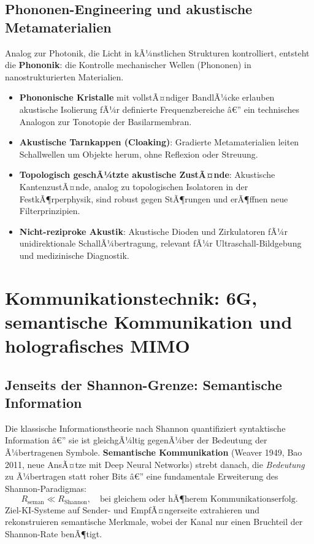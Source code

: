 ﻿\documentclass[12pt,a4paper,titlepage]{report}
\begin{document}
\subsection{Phononen-Engineering und akustische Metamaterialien}

Analog zur Photonik, die Licht in kÃ¼nstlichen Strukturen kontrolliert, entsteht
die \textbf{Phononik}: die Kontrolle mechanischer Wellen (Phononen) in
nanostrukturierten Materialien.
\begin{itemize}[leftmargin=2em]
    \item \textbf{Phononische Kristalle} mit vollstÃ¤ndiger BandlÃ¼cke erlauben
        akustische Isolierung fÃ¼r definierte Frequenzbereiche â€” ein technisches
        Analogon zur Tonotopie der Basilarmembran.
    \item \textbf{Akustische Tarnkappen (Cloaking)}: Gradierte Metamaterialien
        leiten Schallwellen um Objekte herum, ohne Reflexion oder Streuung.
    \item \textbf{Topologisch geschÃ¼tzte akustische ZustÃ¤nde}: Akustische
        KantenzustÃ¤nde, analog zu topologischen Isolatoren in der FestkÃ¶rperphysik,
        sind robust gegen StÃ¶rungen und erÃ¶ffnen neue Filterprinzipien.
    \item \textbf{Nicht-reziproke Akustik}: Akustische Dioden und Zirkulatoren
        fÃ¼r unidirektionale SchallÃ¼bertragung, relevant fÃ¼r Ultraschall-Bildgebung
        und medizinische Diagnostik.
\end{itemize}

\section{Kommunikationstechnik: 6G, semantische Kommunikation und holografisches
MIMO}

\subsection{Jenseits der Shannon-Grenze: Semantische Information}

Die klassische Informationstheorie nach Shannon quantifiziert syntaktische
Information â€” sie ist gleichgÃ¼ltig gegenÃ¼ber der Bedeutung der Ã¼bertragenen Symbole.
\textbf{Semantische Kommunikation} (Weaver 1949, Bao 2011, neue AnsÃ¤tze mit
Deep Neural Networks) strebt danach, die \emph{Bedeutung} zu Ã¼bertragen statt
roher Bits â€” eine fundamentale Erweiterung des Shannon-Paradigmas:
\[
    R_{\text{seman}} \ll R_{\text{Shannon}}, \quad
    \text{bei gleichem oder hÃ¶herem Kommunikationserfolg.}
\]
Ziel-KI-Systeme auf Sender- und EmpfÃ¤ngerseite extrahieren und rekonstruieren
semantische Merkmale, wobei der Kanal nur einen Bruchteil der Shannon-Rate benÃ¶tigt.
\end{document}
